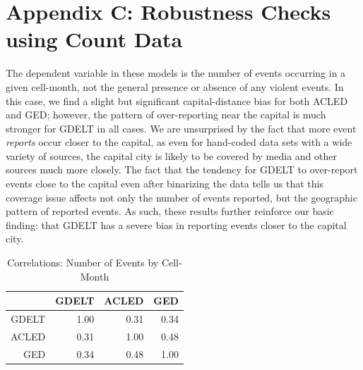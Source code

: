 \documentclass[hidelinks]{article}
\begin{document}
\section*{Appendix C: Robustness Checks using Count Data}
The dependent variable in these models is the number of events occurring in a given cell-month, not the general presence or absence of any violent events. In this case, we find a slight but significant capital-distance bias for both ACLED and GED; however, the pattern of over-reporting near the capital is much stronger for GDELT in all cases. We are unsurprised by the fact that more event \textit{reports} occur closer to the capital, as even for hand-coded data sets with a wide variety of sources, the capital city is likely to be covered by media and other sources much more closely. The fact that the tendency for GDELT to over-report events close to the capital even after binarizing the data tells us that this coverage issue affects not only the number of events reported, but the geographic pattern of reported events. As such, these results further reinforce our basic finding: that GDELT has a severe bias in reporting events closer to the capital city.

\begin{table}[ht]
\centering
\begin{tabular}{rrrr}
  \hline
 & GDELT & ACLED & GED \\ 
  \hline
GDELT & 1.00 & 0.31 & 0.34 \\ 
  ACLED & 0.31 & 1.00 & 0.48 \\ 
GED & 0.34 & 0.48 & 1.00 \\ 
   \hline
\end{tabular}
\caption{Correlations: Number of Events by Cell-Month} 
\end{table}
\end{document}
